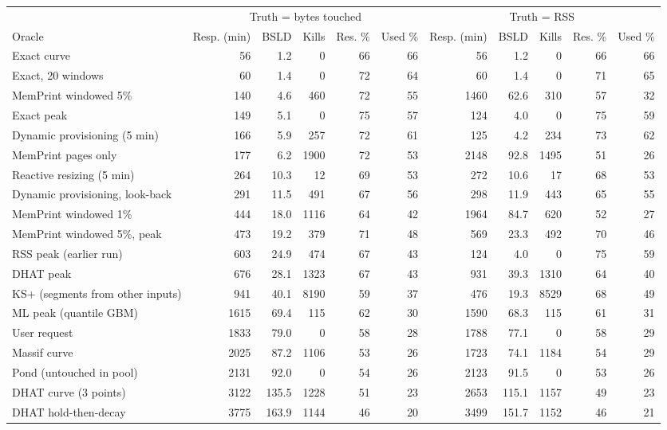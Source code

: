 \begin{tabular}{lrrrrrrrrrr}
\toprule
 & \multicolumn{5}{c}{Truth = bytes touched} & \multicolumn{5}{c}{Truth = RSS} \\
\cmidrule(lr){2-6} \cmidrule(lr){7-11}
Oracle & Resp. (min) & BSLD & Kills & Res. \% & Used \% & Resp. (min) & BSLD & Kills & Res. \% & Used \% \\
\midrule
Exact curve & 56 & 1.2 & 0 & 66 & 66 & 56 & 1.2 & 0 & 66 & 66 \\
Exact, 20 windows & 60 & 1.4 & 0 & 72 & 64 & 60 & 1.4 & 0 & 71 & 65 \\
MemPrint windowed 5\% & 140 & 4.6 & 460 & 72 & 55 & 1460 & 62.6 & 310 & 57 & 32 \\
Exact peak & 149 & 5.1 & 0 & 75 & 57 & 124 & 4.0 & 0 & 75 & 59 \\
Dynamic provisioning (5 min) & 166 & 5.9 & 257 & 72 & 61 & 125 & 4.2 & 234 & 73 & 62 \\
MemPrint pages only & 177 & 6.2 & 1900 & 72 & 53 & 2148 & 92.8 & 1495 & 51 & 26 \\
Reactive resizing (5 min) & 264 & 10.3 & 12 & 69 & 53 & 272 & 10.6 & 17 & 68 & 53 \\
Dynamic provisioning, look-back & 291 & 11.5 & 491 & 67 & 56 & 298 & 11.9 & 443 & 65 & 55 \\
MemPrint windowed 1\% & 444 & 18.0 & 1116 & 64 & 42 & 1964 & 84.7 & 620 & 52 & 27 \\
MemPrint windowed 5\%, peak & 473 & 19.2 & 379 & 71 & 48 & 569 & 23.3 & 492 & 70 & 46 \\
RSS peak (earlier run) & 603 & 24.9 & 474 & 67 & 43 & 124 & 4.0 & 0 & 75 & 59 \\
DHAT peak & 676 & 28.1 & 1323 & 67 & 43 & 931 & 39.3 & 1310 & 64 & 40 \\
KS+ (segments from other inputs) & 941 & 40.1 & 8190 & 59 & 37 & 476 & 19.3 & 8529 & 68 & 49 \\
ML peak (quantile GBM) & 1615 & 69.4 & 115 & 62 & 30 & 1590 & 68.3 & 115 & 61 & 31 \\
User request & 1833 & 79.0 & 0 & 58 & 28 & 1788 & 77.1 & 0 & 58 & 29 \\
Massif curve & 2025 & 87.2 & 1106 & 53 & 26 & 1723 & 74.1 & 1184 & 54 & 29 \\
Pond (untouched in pool) & 2131 & 92.0 & 0 & 54 & 26 & 2123 & 91.5 & 0 & 53 & 26 \\
DHAT curve (3 points) & 3122 & 135.5 & 1228 & 51 & 23 & 2653 & 115.1 & 1157 & 49 & 23 \\
DHAT hold-then-decay & 3775 & 163.9 & 1144 & 46 & 20 & 3499 & 151.7 & 1152 & 46 & 21 \\

\end{tabular}
